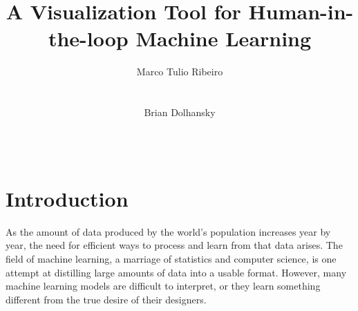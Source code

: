 \documentclass{chi2009}
\begin{document}
\setlength{\paperheight}{11in}
\setlength{\paperwidth}{8.5in}
\setlength{\pdfpageheight}{\paperheight}
\setlength{\pdfpagewidth}{\paperwidth}


\title{A Visualization Tool for Human-in-the-loop Machine Learning}
\author{
  \alignauthor Marco Tulio Ribeiro \\
    \\
    \\
  \alignauthor Brian Dolhansky\\
    \\
    \\
}

\maketitle


% 


\section{Introduction}
As the amount of data produced by the world’s population increases year by year,
the need for efficient ways to process and learn from that data arises. The
field of machine learning, a marriage of statistics and computer science, is one
attempt at distilling large amounts of data into a usable format. However, many
machine learning models are difficult to interpret, or they learn something
different from the true desire of their designers. 
\end{document}
